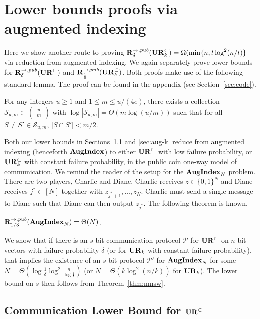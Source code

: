 \section{Lower bounds proofs via augmented indexing}\label{sec:aug-proof}

Here we show another route to proving $\mathbf{R}^{\rightarrow,pub}_\delta(\mathbf{UR}_k^\subset) = \Omega(\min\{n, t\log^2(n/t)\}$ via reduction from augmented indexing. We again separately prove lower bounds for $\mathbf{R}^{\rightarrow,pub}_\delta(\mathbf{UR}^\subset)$ and $\mathbf{R}^{\rightarrow,pub}_{\frac 15}(\mathbf{UR}_k^\subset)$. Both proofs make use of the following standard lemma. The proof can be found in the appendix (see Section~\ref{sec:code}).

\begin{lemma}\label{lem:code}
For any integers $u\ge 1$ and $1\le m\le u/(4e)$, there exists a collection $\mathcal S_{u,m} \subset \binom{[u]}m$ with $\log |\mathcal{S}_{u,m}| = \Theta(m\log(u/m))$ such that for all $S\neq S'\in \mathcal S_{u,m}$, $|S\cap S'| < m/2$.
\end{lemma}

Both our lower bounds in Sections~\ref{sec:aug-delta} and \ref{sec:aug-k} reduce from augmented indexing (henceforth $\mathbf{AugIndex}$) to either $\mathbf{UR}^\subset$ with low failure probability, or $\mathbf{UR}_k^\subset$ with constant failure probability, in the public coin one-way model of communication. We remind the reader of the setup for the $\mathbf{AugIndex}_N$ problem. There are two players, Charlie and Diane. Charlie receives $z\in\{0,1\}^N$ and Diane receives $j^*\in[N]$ together with $z_{j^*+1},\ldots,z_N$. Charlie must send a single message to Diane such that Diane can then output $z_{j^*}$. The following theorem is known.

\begin{theorem}{\cite{MiltersenNSW98}}\label{thm:mnsw}
$\mathbf{R}^{\rightarrow,pub}_{1/3}(\mathbf{AugIndex}_N) = \Theta(N)$.
\end{theorem}

We show that if there is an $s$-bit communication protocol $\mathcal P$ for $\mathbf{UR}^\subset$ on $n$-bit vectors with failure probability $\delta$ (or for $\mathbf{UR}_k$ with constant failure probability), that implies the existence of an $s$-bit protocol $\mathcal P'$ for $\mathbf{AugIndex}_N$ for some $N=\Theta(\log\frac 1{\delta}\log^2\frac n{\log\frac 1{\delta}})$ (or $N=\Theta(k\log^2(n/k))$ for $\mathbf{UR}_k$). The lower bound on $s$ then follows from Theorem~\ref{thm:mnsw}.


\subsection{Communication Lower Bound for $\mathbf{UR}^\subset$}\label{sec:aug-delta}


